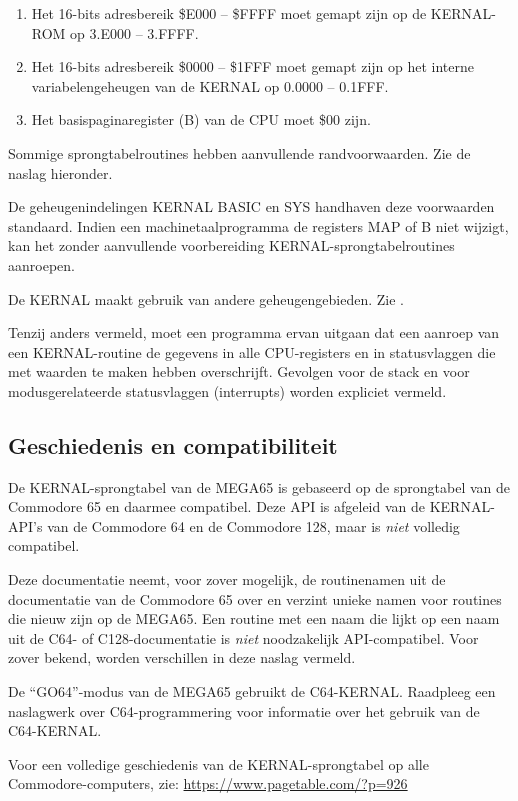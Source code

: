 \begin{enumerate}
\item Het 16-bits adresbereik \$E000 -- \$FFFF moet gemapt zijn op de KERNAL-ROM op 3.E000 -- 3.FFFF.\item Het 16-bits adresbereik \$0000 -- \$1FFF moet gemapt zijn op het interne variabelengeheugen van de KERNAL op 0.0000 -- 0.1FFF.\item Het basispaginaregister (B) van de CPU moet \$00 zijn.
\end{enumerate}

Sommige sprongtabelroutines hebben aanvullende randvoorwaarden. Zie de naslag hieronder.

De geheugenindelingen KERNAL BASIC en SYS handhaven deze voorwaarden standaard. Indien een machinetaalprogramma de registers MAP of B niet wijzigt, kan het zonder aanvullende voorbereiding KERNAL-sprongtabelroutines aanroepen.

De KERNAL maakt gebruik van andere geheugengebieden. Zie .

Tenzij anders vermeld, moet een programma ervan uitgaan dat een aanroep van een KERNAL-routine de gegevens in alle CPU-registers en in statusvlaggen die met waarden te maken hebben overschrijft. Gevolgen voor de stack en voor modusgerelateerde statusvlaggen (interrupts) worden expliciet vermeld.

\subsection{Geschiedenis en compatibiliteit}

De KERNAL-sprongtabel van de MEGA65 is gebaseerd op de sprongtabel van de Commodore 65 en daarmee compatibel. Deze API is afgeleid van de KERNAL-API's van de Commodore 64 en de Commodore 128, maar is \emph{niet} volledig compatibel.

Deze documentatie neemt, voor zover mogelijk, de routinenamen uit de documentatie van de Commodore 65 over en verzint unieke namen voor routines die nieuw zijn op de MEGA65. Een routine met een naam die lijkt op een naam uit de C64- of C128-documentatie is \emph{niet} noodzakelijk API-compatibel. Voor zover bekend, worden verschillen in deze naslag vermeld.

De ``GO64''-modus van de MEGA65 gebruikt de C64-KERNAL. Raadpleeg een naslagwerk over C64-programmering voor informatie over het gebruik van de C64-KERNAL.

Voor een volledige geschiedenis van de KERNAL-sprongtabel op alle Commodore-computers, zie: \url{https://www.pagetable.com/?p=926}

